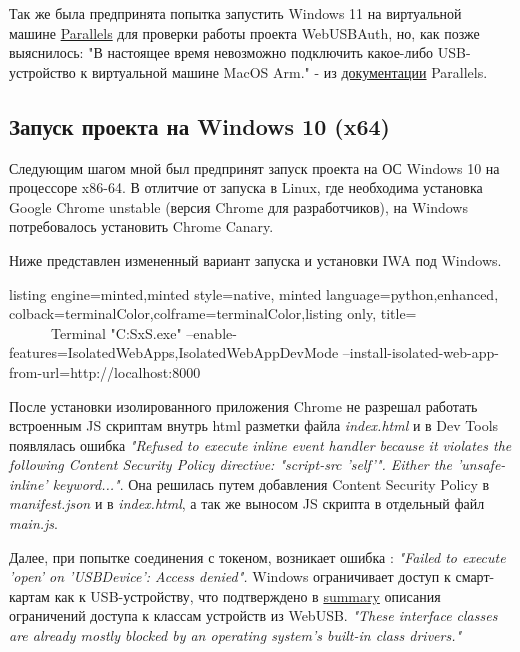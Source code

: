 \documentclass[12pt]{article}
\begin{document}
Так же была предпринята попытка запустить Windows 11 на виртуальной машине \href{https://www.parallels.com}{{Parallels}} для проверки работы проекта WebUSBAuth, но, как позже выяснилось: "В настоящее время невозможно подключить какое-либо USB-устройство к виртуальной машине MacOS Arm." - из \href{https://kb.parallels.com/128867}{{документации}} Parallels. 

\subsection{Запуск проекта на Windows 10 (x64)}
Следующим шагом мной был предпринят запуск проекта на ОС Windows 10 на процессоре x86-64. В отлитчие от запуска в Linux, где необходима установка Google Chrome unstable (версия Chrome для разработчиков), на Windows потребовалось установить Chrome Canary. 

Ниже представлен измененный вариант запуска и установки IWA под Windows.
\begin{tcblisting}{listing engine=minted,minted style=native,
    minted language=python,enhanced,
    colback=terminalColor,colframe=terminalColor,listing only, title= ~~~~~~Terminal}
    "C:\Users{}\AppData\Local\Google\Chrome SxS\Application\chrome.exe" --enable-features=IsolatedWebApps,IsolatedWebAppDevMode --install-isolated-web-app-from-url=http://localhost:8000
\end{tcblisting}
После установки изолированного приложения Chrome не разрешал работать встроенным JS скриптам внутрь html разметки файла \emph{index.html} и в Dev Tools появлялась ошибка \emph{"Refused to execute inline event handler because it violates the following Content Security Policy directive: "script-src 'self'". Either the 'unsafe-inline' keyword..."}. Она решилась путем добавления Content Security Policy в \emph{manifest.json} и в \emph{index.html}, а так же выносом JS скрипта в отдельный файл \emph{main.js}. 

Далее, при попытке соединения с токеном, возникает ошибка : \emph{"Failed to execute 'open' on
'USBDevice': Access denied".} Windows ограничивает доступ к смарт-картам как к USB-устройству, что подтверждено в \href{https://groups.google.com/a/chromium.org/g/blink-dev/c/LZXocaeCwDw/m/GLfAffGLAAAJ}{{summary}} описания ограничений доступа к классам устройств из WebUSB. \emph{"These interface classes are already mostly blocked by an operating system’s built-in class drivers."}
\end{document}
